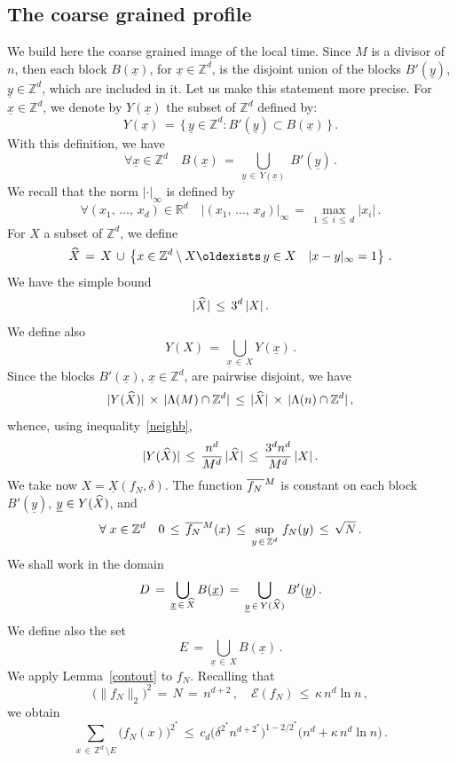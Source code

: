 \documentclass[10pt]{amsart}
\theoremstyle{definition}\newtheorem{defi}[theo]{Definition}\newtheorem{rema}[theo]{Remark}\newtheorem{exam}[theo]{Example}\newtheorem{exem}[theo]{Example}\newtheorem{nota}[theo]{Notation}
\newcommand{\ex}{{\exists\, }}
\newcommand{\XX}{{\underline{X}}}
\newcommand{\xx}{{\underline{x}}}
\newcommand{\yy}{{\underline{y}}}
\newcommand*\fmn{\overline{f_N\,}^{\lower2pt\hbox{$\scriptstyle M$}}}
\newcommand*\Zd {{\mathbb Z^d}}
\newcommand*\Rd {{\mathbb R^d}}
\newcommand*\hX{\smash{\widehat X}}
\newcommand*\La {{\Lambda}}
\newcommand{\cE}{\mathcal{E}}
\renewcommand*{\exists}{\mathrel{\oldexists}}
\let\oldforall\forall
\renewcommand*{\forall}{\mathrel{\oldforall}}
\begin{document}
\subsection{The coarse grained profile}\label{coars}
We build here the coarse grained image of the local time. Since $M$ is a divisor of $n$, then each block $B(\xx)$, for $\xx\in\Zd$, is the disjoint union of the blocks $B'(\yy)$, $\yy\in\Zd$, which are included in it. Let us make this statement more precise. For $\xx\in\Zd$, we denote by $Y(\xx)$ the subset of $\Zd$ defined by:
\[
Y(\xx)\,=\,\big\{\,\yy\in\Zd:B'(\yy)\subset B(\xx)\,\big\}\,.
\]
With this definition, we have
\[
\forall \xx\in\Zd\quad
B(\xx)\,=\,\bigcup_{\yy\,\in\,Y(\xx)}\;B'(\yy)\,.
\]
We recall that the norm $|\cdot|_\infty$ is defined by
\[
\forall (x_1,\,\dots,\,x_d)\in\Rd\quad
|(x_1,\,\dots,\,x_d)|_\infty\,=\,
{\max_{1\,\leq\,i\,\leq\,d}|x_i|}\,.
\]
For $X$ a subset of $\Zd$, we define
\[
\hX\,=\,X\,\cup\,
\left\{ x\in \Zd \setminus X \ex y\in X\quad |x-y|_\infty=1 \right\}\,.
\]
We have the simple bound
\begin{equation}\label{neighb}
|\hX|\,\leq \,3^d\, |X|\,.
\end{equation}
We define also
\[
Y(X)\,=\,\bigcup_{\xx\,\in\,X}Y(\xx)\,.
\]
Since the blocks $B'(\xx)$, $\xx\in\Zd$, are pairwise disjoint, we have
\[
|Y(\hX)|\,\times\,|\La(M)\cap\Zd|\,\leq\,
|\hX|\,\times\,|\La(n)\cap\Zd|\,,
\]
whence, using inequality~\eqref{neighb},
\begin{equation}\label{heb}
|Y(\hX)|\,\leq\,
\frac{n^d}{M^d}\,|\hX|
\,\leq\,
\frac{3^dn^d}{M^d}\,|X|
\,.
\end{equation}
We take now $X=\XX(f_N,\delta)$. The function $\fmn$ is constant on each block $B'(\yy)$, $\yy\in Y(\hX)$, and
\[
\forall x\in \Zd\quad
0\,\leq\,\fmn(x)\,\leq\,
\sup_{y\,\in\,\Zd}\,f_N(y)\,\leq\,\sqrt{N}\,.
\]
We shall work in the domain
\begin{equation}\label{bad}
D\,=\,\bigcup_{\xx\,\in\,\hX}B(\xx)\,=\,
\bigcup_{\yy\,\in\,Y(\hX)}B'(\yy)\,.
\end{equation}
We define also the set
\begin{equation}\label{bod}
E\,=\,\bigcup_{\xx\,\in\,X}B(\xx)\,.
\end{equation}
We apply Lemma~\ref{contout} to $f_N$. Recalling that
\[
\big(\|f_N\|_{2}\big)^2\,=\,N\,=\,n^{d+2}\,,\quad
\cE(f_N)\,\leq\,\kappa\,n^d\ln n\,,
\]
we obtain
\begin{equation}\label{outd}
\sum_{x\,\in\,
\Zd\,\setminus E}
\big(f_N(x)\big)^{2^*}\,\leq\, c_d\big(
\delta^{2^*} n^{d+2^*}
\big)^{1-2/2^*}
\big(n^d+ {\kappa \,n^d\ln n}
\big)\,.
\end{equation}
\end{document}

